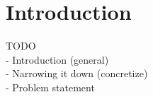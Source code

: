 \chapter{Introduction}
\label{chap:introduction}
TODO \\
- Introduction (general) \\
- Narrowing it down (concretize) \\
- Problem statement \\